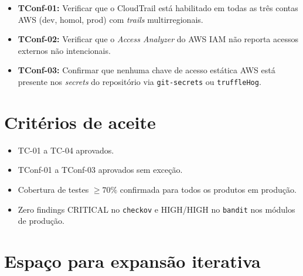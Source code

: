 \begin{itemize}[leftmargin=*]
  \item \textbf{TConf-01:} Verificar que o CloudTrail est\'a habilitado
        em todas as tr\^es contas AWS (dev, homol, prod) com \textit{trails}
        multirregionais.
  \item \textbf{TConf-02:} Verificar que o \textit{Access Analyzer} do
        AWS IAM n\~ao reporta acessos externos n\~ao intencionais.
  \item \textbf{TConf-03:} Confirmar que nenhuma chave de acesso est\'atica
        AWS est\'a presente nos \textit{secrets} do reposit\'orio via
        \texttt{git-secrets} ou \texttt{truffleHog}.
\end{itemize}

\section{Crit\'erios de aceite}

\begin{itemize}[leftmargin=*]
  \item TC-01 a TC-04 aprovados.
  \item TConf-01 a TConf-03 aprovados sem exce\c{c}\~ao.
  \item Cobertura de testes $\geq 70\%$ confirmada para todos os
        produtos em produ\c{c}\~ao.
  \item Zero findings CRITICAL no \texttt{checkov} e HIGH/HIGH no
        \texttt{bandit} nos m\'odulos de produ\c{c}\~ao.
\end{itemize}

\section{Espa\c{c}o para expans\~ao iterativa}

